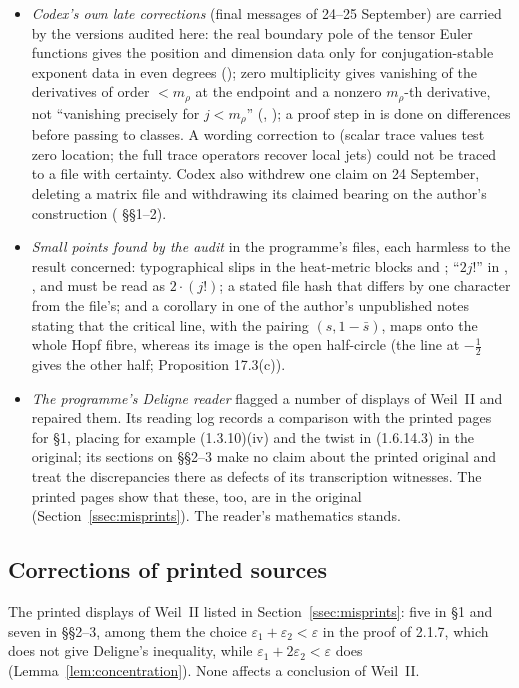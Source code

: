 \begin{itemize}
\item \emph{Codex's own late corrections} (final messages of 24--25 September) are carried by the versions audited here: the real boundary pole of the tensor Euler functions gives the position and dimension data only for conjugation-stable exponent data in even degrees (); zero multiplicity gives vanishing of the derivatives of order $<m_\rho$ at the endpoint and a nonzero $m_\rho$-th derivative, not ``vanishing precisely for $j<m_\rho$'' (, ); a proof step in  is done on differences before passing to classes. A wording correction to  (scalar trace values test zero location; the full trace operators recover local jets) could not be traced to a file with certainty. Codex also withdrew one claim on 24 September, deleting a matrix file and withdrawing its claimed bearing on the author's construction ( §§1--2).
\item \emph{Small points found by the audit} in the programme's files, each harmless to the result concerned: typographical slips in the heat-metric blocks  and ; ``$2j!$'' in , ,  and  must be read as $2\cdot(j!)$; a stated file hash that differs by one character from the file's; and a corollary in one of the author's unpublished notes stating that the critical line, with the pairing $(s,1-\bar s)$, maps onto the whole Hopf fibre, whereas its image is the open half-circle (the line at $-\tfrac12$ gives the other half;  Proposition 17.3(c)).
\item \emph{The programme's Deligne reader} flagged a number of displays of Weil~II and repaired them. Its reading log records a comparison with the printed pages for §1, placing for example (1.3.10)(iv) and the twist in (1.6.14.3) in the original; its sections on §§2--3 make no claim about the printed original and treat the discrepancies there as defects of its transcription witnesses. The printed pages show that these, too, are in the original (Section~\ref{ssec:misprints}). The reader's mathematics stands.
\end{itemize}

\subsection{Corrections of printed sources}

The printed displays of Weil~II listed in Section~\ref{ssec:misprints}: five in §1 and seven in §§2--3, among them the choice $\varepsilon_1+\varepsilon_2<\varepsilon$ in the proof of 2.1.7, which does not give Deligne's inequality, while $\varepsilon_1+2\varepsilon_2<\varepsilon$ does (Lemma~\ref{lem:concentration}). None affects a conclusion of Weil~II.
